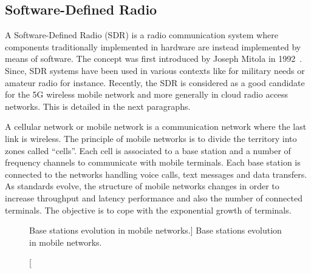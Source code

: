 \newpage
\subsection{Software-Defined Radio}

A Software-Defined Radio (SDR) is a radio communication system where components
traditionally implemented in hardware are instead implemented by means of
software. The concept was first introduced by Joseph Mitola in
1992~\cite{Mitola1992,Mitola1993}. Since, SDR systems have been used in various
contexts like for military needs or amateur radio for instance. Recently, the
SDR is considered as a good candidate for the 5G wireless mobile network and
more generally in cloud radio access networks. This is detailed in the next
paragraphs.

A cellular network or mobile network is a communication network where the last
link is wireless. The principle of mobile networks is to divide the territory
into zones called ``cells''. Each cell is associated to a base station and a
number of frequency channels to communicate with mobile terminals. Each base
station is connected to the networks handling voice calls, text messages and
data transfers. As standards evolve, the structure of mobile networks changes in
order to increase throughput and latency performance and also the number of
connected terminals. The objective is to cope with the exponential growth of
terminals.

\begin{figure}[htp]
  \centering
  \quad{}
  \quad{}
  \caption
    [Base stations evolution in mobile networks.]
    {Base stations evolution in mobile networks.}
  \label{fig:ctx_sdr_base_station}
\end{figure}

